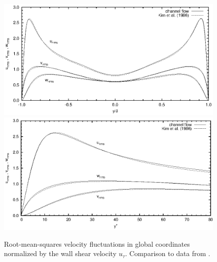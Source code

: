 \documentclass[11pt,a4paper]{report}
\begin{document}
\begin{figure}
\begin{center}
\includegraphics[width=0.7\linewidth]{dns_rms_global.ps}\\
\includegraphics[width=0.67\linewidth]{dns_rms_wall.ps}
\end{center}
\caption{ Root-mean-squares velocity fluctuations in global
  coordinates normalized by the wall shear velocity
  $u_{\tau}$. Comparison to data from \citet{kmm87}.}
\label{pic:rms_global}
\end{figure}





\end{document}
